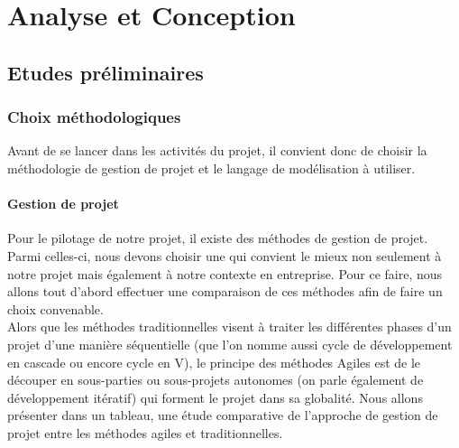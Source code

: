 \chapter{Analyse et Conception}

\section{Etudes préliminaires}

\subsection{Choix méthodologiques }

Avant de se lancer dans les activités du projet, il convient donc de choisir la méthodologie de gestion de projet et le langage de modélisation à utiliser. 

\subsubsection{Gestion de projet}

	Pour le pilotage de notre projet, il existe des méthodes de gestion de projet. Parmi celles-ci,  nous devons choisir une qui convient le mieux non seulement à notre projet mais également à notre contexte en entreprise. Pour ce faire, nous allons tout d’abord effectuer une comparaison de ces méthodes afin de faire un choix convenable.\\
Alors que les méthodes traditionnelles visent à traiter les différentes phases d’un projet d’une manière séquentielle (que l’on nomme aussi cycle de développement en cascade ou encore cycle en V), le principe des méthodes Agiles est de le découper en sous-parties ou sous-projets autonomes (on parle également de développement itératif) qui forment le projet dans sa globalité. 
Nous allons présenter dans un tableau, une étude comparative de l’approche de gestion de projet entre les méthodes agiles et traditionnelles. \\

